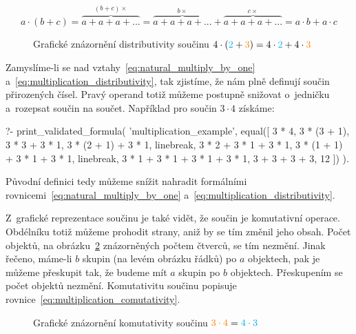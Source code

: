 \begin{equation}
\label{eq:multiplication_distributivity_proof}
a \cdot (b + c) = \overbrace{a + a + a + ...}^{(b + c) \times} = \overbrace{a + a + a + ...}^{b \times} + \overbrace{a + a + a + ...}^{c \times} = a \cdot b + a \cdot c
\end{equation}

\begin{figure}[!h]
\centering
{}
\caption{Grafické znázornění distributivity součinu \(4 \cdot (\textcolor{cyan}{2} + \textcolor{orange}{3}) = 4 \cdot \textcolor{cyan}{2} + 4 \cdot \textcolor{orange}{3}\)}
\label{img:multiplication_distributivity}
\end{figure}

Zamyslíme-li se nad vztahy~\ref{eq:natural_multiply_by_one} a~\ref{eq:multiplication_distributivity}, tak zjistíme, že nám plně definují součin přirozených čísel. Pravý operand totiž můžeme postupně snižovat o~jedničku a~rozepsat součin na součet. Například pro součin \(3 \cdot 4\) získáme:

\begin{prolog}
?-	print_validated_formula(
		'multiplication_example',
		equal([
			3 * 4,
			3 * (3 + 1),
			3 * 3 + 3 * 1,
			3 * (2 + 1) + 3 * 1,
			linebreak,
			3 * 2 + 3 * 1 + 3 * 1,
			3 * (1 + 1) + 3 * 1 + 3 * 1,
			linebreak,
			3 * 1 + 3 * 1 + 3 * 1 + 3 * 1,
			3 + 3 + 3 + 3,
			12
		])
	).				
\end{prolog}

Původní definici tedy můžeme snížit nahradit formálními rovnicemi~\ref{eq:natural_multiply_by_one} a~\ref{eq:multiplication_distributivity}.

Z~grafické reprezentace součinu je také vidět, že součin je komutativní operace. Obdélníku totiž můžeme prohodit strany, aniž by se tím změnil jeho obsah. Počet objektů, na obrázku~\ref{img:multiplication_comutativity} znázorněných počtem čtverců, se tím nezmění. Jinak řečeno, máme-li \(b\) skupin (na levém obrázku řádků) po \(a\) objektech, pak je můžeme přeskupit tak, že budeme mít \(a\) skupin po \(b\) objektech. Přeskupením se počet objektů nezmění. Komutativitu součinu popisuje rovnice~\eqref{eq:multiplication_comutativity}.

\begin{figure}[!h]
\centering
{}
\caption{Grafické znázornění komutativity součinu \(\textcolor{orange}{3 \cdot 4} = \textcolor{cyan}{4 \cdot 3}\)}
\label{img:multiplication_comutativity}
\end{figure}

